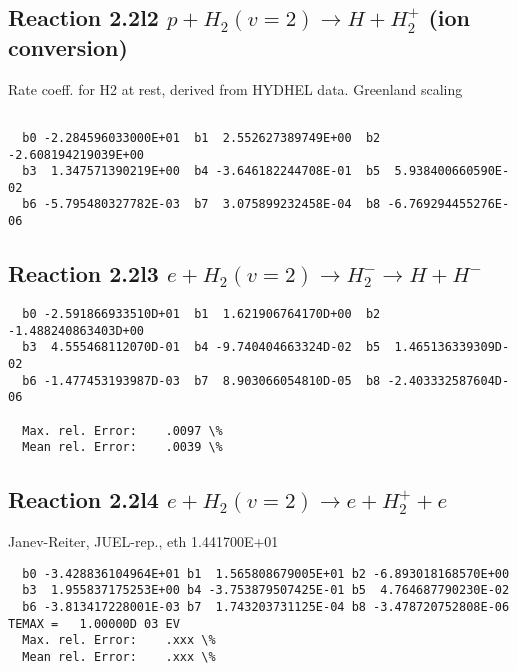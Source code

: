 \documentclass[12pt,dvipdfmx]{article}
\begin{document}
\subsection{
Reaction 2.2l2
$ p + H_2(v=2) \rightarrow H + H_2^+$ (ion conversion)
}
Rate coeff. for H2 at rest, derived from HYDHEL data. Greenland scaling


\begin{small}\begin{verbatim}

  b0 -2.284596033000E+01  b1  2.552627389749E+00  b2 -2.608194219039E+00
  b3  1.347571390219E+00  b4 -3.646182244708E-01  b5  5.938400660590E-02
  b6 -5.795480327782E-03  b7  3.075899232458E-04  b8 -6.769294455276E-06

\end{verbatim}\end{small}

\newpage

\subsection{
Reaction 2.2l3
 $ e + H_2(v=2) \rightarrow H_2^- \rightarrow H + H^-$
}


\begin{small}\begin{verbatim}
  b0 -2.591866933510D+01  b1  1.621906764170D+00  b2 -1.488240863403D+00
  b3  4.555468112070D-01  b4 -9.740404663324D-02  b5  1.465136339309D-02
  b6 -1.477453193987D-03  b7  8.903066054810D-05  b8 -2.403332587604D-06

  Max. rel. Error:    .0097 \%
  Mean rel. Error:    .0039 \%
\end{verbatim}\end{small}

\subsection{
Reaction 2.2l4
 $ e + H_2(v=2) \rightarrow e + H_2^+  + e$
}
Janev-Reiter, JUEL-rep., eth 1.441700E+01

\begin{small}\begin{verbatim}
  b0 -3.428836104964E+01 b1  1.565808679005E+01 b2 -6.893018168570E+00
  b3  1.955837175253E+00 b4 -3.753879507425E-01 b5  4.764687790230E-02
  b6 -3.813417228001E-03 b7  1.743203731125E-04 b8 -3.478720752808E-06
TEMAX =   1.00000D 03 EV
  Max. rel. Error:    .xxx \%
  Mean rel. Error:    .xxx \%
\end{verbatim}\end{small}
\newpage
\end{document}
